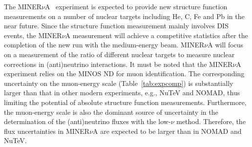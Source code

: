 The MINER$\nu$A~\cite{Osmanov:2011ig} experiment is expected to provide new structure
function measurements on a number of nuclear targets including He, C,
Fe and Pb in the near future.  Since the structure function
measurement mainly involves DIS events, the MINER$\nu$A measurement
will achieve a competitive statistics after the completion of the new
run with the medium-energy beam. 
MINER$\nu$A will focus on a measurement of the ratio of different nuclear
targets to measure nuclear corrections in (anti)neutrino
interactions. It must be noted that the MINER$\nu$A experiment relies
on the MINOS ND for muon identification.  The corresponding
uncertainty on the muon-energy scale (Table~\ref{tab:expcomp}) is
substantially larger than that in other modern experiments, e.g.,
NuTeV and NOMAD, thus limiting %
the potential of absolute
structure function measurements. Furthermore, the muon-energy scale is
also the dominant source of uncertainty in the determination of the
(anti)neutrino fluxes with the low-$\nu$ method.  Therefore, the flux
uncertainties in MINER$\nu$A are %
expected to be larger than in
NOMAD and NuTeV. 
 

